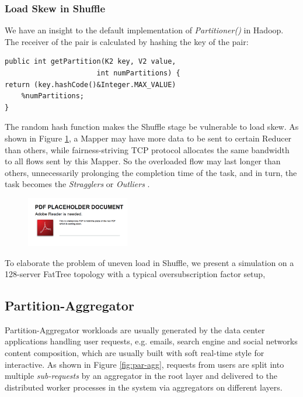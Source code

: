 \subsubsection{Load Skew in Shuffle}

We have an insight to the default implementation of \emph{Partitioner()} in Hadoop. The receiver of the pair is calculated by hashing the key of the pair:

\begin{verbatim}
public int getPartition(K2 key, V2 value,  
                      int numPartitions) {  
return (key.hashCode()&Integer.MAX_VALUE) 
	%numPartitions;  
}  
\end{verbatim}

The random hash function makes the Shuffle stage be vulnerable to load skew. As shown in Figure \ref{fig:shuffle_uneven_load}, a Mapper may have more data to be sent to certain Reducer than others, while fairness-striving TCP protocol allocates the same bandwidth to all flows sent by this Mapper. So the overloaded flow may last longer than others, unnecessarily prolonging the completion time of the task, and in turn, the task becomes the \emph{Stragglers} or \emph{Outliers} \cite{Mantri} \cite{LATE}. 

\begin{figure}
  \centering
  \includegraphics[width=0.4\textwidth]{pic/placeholder}\\
  \caption{}
  \label{fig:shuffle_uneven_load}
\end{figure}

To elaborate the problem of uneven load in Shuffle, we present a simulation on a 128-server FatTree topology with a typical oversubscription factor setup, \cite{DatacenterDesign} 

\subsection{Partition-Aggregator}

Partition-Aggregator \cite{DCTCP} workloads are usually generated by the data center applications handling user requests, e.g. emails, search engine and social networks content composition, which are usually built with soft real-time style for interactive. As shown in Figure \ref{fig:par-agg}, requests from users are split into multiple \emph{sub-requests} by an aggregator in the root layer and delivered to the distributed worker processes in the system via aggregators on different layers. 

